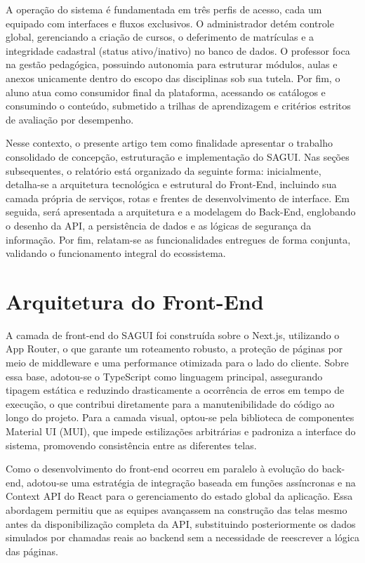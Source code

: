 \documentclass[12pt]{article}
\begin{document}
A operação do sistema é fundamentada em três perfis de acesso, cada um equipado com interfaces e fluxos exclusivos. O administrador detém controle global, gerenciando a criação de cursos, o deferimento de matrículas e a integridade cadastral (status ativo/inativo) no banco de dados. O professor foca na gestão pedagógica, possuindo autonomia para estruturar módulos, aulas e anexos unicamente dentro do escopo das disciplinas sob sua tutela. Por fim, o aluno atua como consumidor final da plataforma, acessando os catálogos e consumindo o conteúdo, submetido a trilhas de aprendizagem e critérios estritos de avaliação por desempenho.

Nesse contexto, o presente artigo tem como finalidade apresentar o trabalho consolidado de concepção, estruturação e implementação do SAGUI. Nas seções subsequentes, o relatório está organizado da seguinte forma: inicialmente, detalha-se a arquitetura tecnológica e estrutural do Front-End, incluindo sua camada própria de serviços, rotas e frentes de desenvolvimento de interface. Em seguida, será apresentada a arquitetura e a modelagem do Back-End, englobando o desenho da API, a persistência de dados e as lógicas de segurança da informação. Por fim, relatam-se as funcionalidades entregues de forma conjunta, validando o funcionamento integral do ecossistema.


\section{Arquitetura do Front-End}
A camada de front-end do SAGUI foi construída sobre o Next.js, utilizando o App Router, o que garante um roteamento robusto, a proteção de páginas por meio de middleware e uma performance otimizada para o lado do cliente. Sobre essa base, adotou-se o TypeScript como linguagem principal, assegurando tipagem estática e reduzindo drasticamente a ocorrência de erros em tempo de execução, o que contribui diretamente para a manutenibilidade do código ao longo do projeto. Para a camada visual, optou-se pela biblioteca de componentes Material UI (MUI), que impede estilizações arbitrárias e padroniza a interface do sistema, promovendo consistência entre as diferentes telas.

Como o desenvolvimento do front-end ocorreu em paralelo à evolução do back-end, adotou-se uma estratégia de integração baseada em funções assíncronas e na Context API do React para o gerenciamento do estado global da aplicação. Essa abordagem permitiu que as equipes avançassem na construção das telas mesmo antes da disponibilização completa da API, substituindo posteriormente os dados simulados por chamadas reais ao backend sem a necessidade de reescrever a lógica das páginas.
\end{document}
